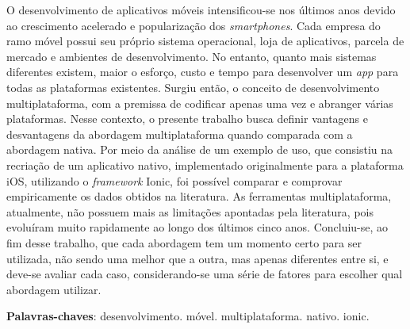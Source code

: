 \begin{resumo}

 O desenvolvimento de aplicativos móveis intensificou-se nos últimos anos devido ao crescimento acelerado e popularização dos \textit{smartphones}. Cada empresa
 do ramo móvel possui seu próprio sistema operacional, loja de aplicativos, parcela de mercado e ambientes de desenvolvimento. No entanto, quanto mais 
 sistemas diferentes existem, maior o esforço, custo e tempo para desenvolver um \textit{app} para todas as plataformas existentes. Surgiu então, o conceito de desenvolvimento multiplataforma,
 com a premissa de codificar apenas uma vez e abranger várias plataformas. Nesse contexto, o presente trabalho busca definir vantagens e desvantagens da abordagem
 multiplataforma quando comparada com a abordagem nativa. Por meio da análise de um exemplo de uso, que consistiu na recriação de um aplicativo nativo, implementado originalmente para a plataforma iOS,
 utilizando o \textit{framework} Ionic, foi possível comparar e comprovar empiricamente os dados obtidos na literatura. As ferramentas multiplataforma, atualmente,
 não possuem mais as limitações apontadas pela literatura, pois evoluíram muito rapidamente ao longo dos últimos cinco anos. Concluiu-se, ao fim desse trabalho, que cada abordagem tem um momento certo
 para ser utilizada, não sendo uma melhor que a outra, mas apenas diferentes entre si, e deve-se avaliar cada caso, considerando-se uma série de fatores para escolher qual abordagem utilizar.

 \vspace{\onelineskip}
    
 \noindent
 \textbf{Palavras-chaves}: desenvolvimento. móvel. multiplataforma. nativo. ionic. 
\end{resumo}
